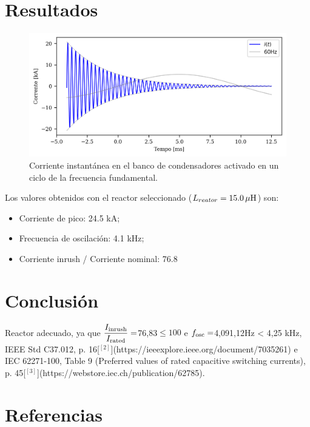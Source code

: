 \documentclass[a4paper]{article}
\begin{document}
	\section{Resultados}
	\begin{figure}[!hbp]
		\centering
		\includegraphics{Correntes.png}
		\caption{Corriente instantánea en el banco de condensadores activado en un ciclo de la frecuencia fundamental.}
		\label{fig:picture2}
	\end{figure}
	
	Los valores obtenidos con el reactor seleccionado ($L_{reator} = 15.0 \, \mu \rm{H} $) son:
	\begin{itemize}[label=\textendash]
		\item Corriente de pico: 24.5 kA;
		\item Frecuencia de oscilación: 4.1 kHz;
		\item Corriente inrush / Corriente nominal: 76.8
	\end{itemize}
	
	\section{Conclusión}
	Reactor adecuado, ya que $\dfrac{I_{\rm inrush}}{I_{\rm rated}} = $76,83$\le 100$ e $f_{\rm osc} = $4,091,12Hz < 4,25 kHz, IEEE Std C37.012, p. 16[$^{[2]}$](https://ieeexplore.ieee.org/document/7035261) e IEC 62271-100, Table 9 (Preferred values of rated capacitive switching currents), p. 45[$^{[3]}$](https://webstore.iec.ch/publication/62785).
	
	\section{Referencias}
	
\end{document}

